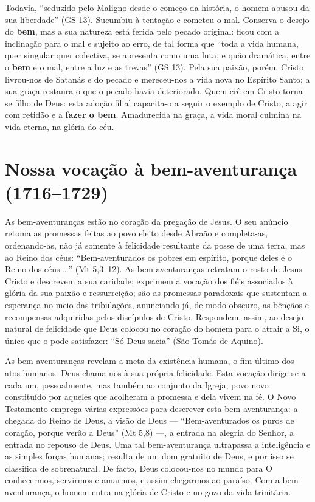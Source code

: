 Todavia, ``seduzido pelo Maligno desde o começo da história, o homem abusou da sua liberdade'' (GS 13). Sucumbiu à tentação e cometeu o mal. Conserva o desejo do \textbf{bem}, mas a sua natureza está ferida pelo pecado original: ficou com a inclinação para o mal e sujeito ao erro, de tal forma que ``toda a vida humana, quer singular quer colectiva, se apresenta como uma luta, e quão dramática, entre o \textbf{bem} e o mal, entre a luz e as trevas'' (GS 13). Pela sua paixão, porém, Cristo livrou-nos de Satanás e do pecado e mereceu-nos a vida nova no Espírito Santo; a sua graça restaura o que o pecado havia deteriorado. Quem crê em Cristo torna-se filho de Deus: esta adoção filial capacita-o a seguir o exemplo de Cristo, a agir com retidão e a \textbf{fazer o bem}. Amadurecida na graça, a vida moral culmina na vida eterna, na glória do céu.

\section{Nossa vocação à bem-aventurança (1716--1729)}

As bem-aventuranças estão no coração da pregação de Jesus. O seu anúncio retoma as promessas feitas ao povo eleito desde Abraão e completa-as, ordenando-as, não já somente à felicidade resultante da posse de uma terra, mas ao Reino dos céus: ``Bem-aventurados os pobres em espírito, porque deles é o Reino dos céus \ldots'' (Mt 5,3--12). As bem-aventuranças retratam o rosto de Jesus Cristo e descrevem a sua caridade; exprimem a vocação dos fiéis associados à glória da sua paixão e ressurreição; são as promessas paradoxais que sustentam a esperança no meio das tribulações, anunciando já, de modo obscuro, as bênçãos e recompensas adquiridas pelos discípulos de Cristo. Respondem, assim, ao desejo natural de felicidade que Deus colocou no coração do homem para o atrair a Si, o único que o pode satisfazer: ``Só Deus sacia'' (São Tomás de Aquino).

As bem-aventuranças revelam a meta da existência humana, o fim último dos atos humanos: Deus chama-nos à sua própria felicidade. Esta vocação dirige-se a cada um, pessoalmente, mas também ao conjunto da Igreja, povo novo constituído por aqueles que acolheram a promessa e dela vivem na fé. O Novo Testamento emprega várias expressões para descrever esta bem-aventurança: a chegada do Reino de Deus, a visão de Deus --- ``Bem-aventurados os puros de coração, porque verão a Deus'' (Mt 5,8) ---, a entrada na alegria do Senhor, a entrada no repouso de Deus. Uma tal bem-aventurança ultrapassa a inteligência e as simples forças humanas; resulta de um dom gratuito de Deus, e por isso se classifica de sobrenatural. De facto, Deus colocou-nos no mundo para O conhecermos, servirmos e amarmos, e assim chegarmos ao paraíso. Com a bem-aventurança, o homem entra na glória de Cristo e no gozo da vida trinitária.

